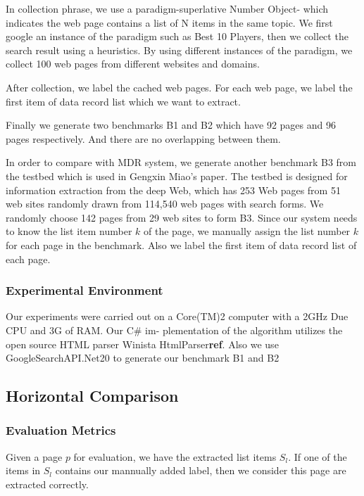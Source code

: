 In collection phrase, we use a paradigm-superlative Number Object- which indicates the web page contains a list of N items in the same topic. We first google an instance of the paradigm such as Best 10 Players, then we collect the search result using a heuristics. By using different instances of the paradigm, we collect 100 web pages from different websites and domains.

After collection, we label the cached web pages. 
For each web page, 
we label the first item of data record list which we want to extract.

Finally we generate two benchmarks B1 and B2
which have 92 pages and 96 pages respectively.
And there are no overlapping between them.

In order to compare with MDR\cite{LiuGZ03:MDR} system,
we generate another benchmark B3 
from the testbed\cite{deepwebtestbed} 
which is used in Gengxin Miao's paper\cite{MiaoTHSM09:TagPathClustering}.
The testbed is designed for information extraction from the deep Web,
which has 253 Web pages from 51 web sites randomly 
drawn from 114,540 web pages with search forms.
We randomly choose 142 pages from 29 web sites to form B3.
Since our system needs to know the list item number $k$ of the page,
we manually assign the list number $k$ for each page in the benchmark.
Also we label the first item of data record list of each page.

\subsubsection{Experimental Environment}
Our experiments were carried out on a Core(TM)2 computer
with a 2GHz Due CPU and 3G of RAM. Our C\# im-
plementation of the algorithm utilizes the open source 
HTML parser Winista HtmlParser{\bf ref}. 
Also we use GoogleSearchAPI.Net20 to generate our benchmark B1 and B2

\subsection{Horizontal Comparison}

\subsubsection{Evaluation Metrics}

Given a page $p$ for evaluation, 
we have the extracted list items $S_l$. 
If one of the items in $S_l$ contains our mannually added label, 
then we consider this page are extracted correctly.

